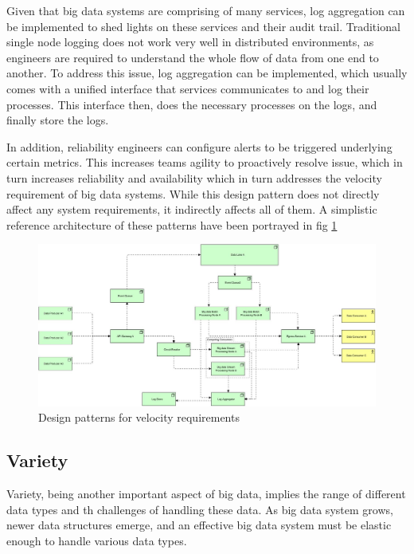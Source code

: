 \documentclass[conference]{IEEEtran}
\begin{document}
Given that big data systems are comprising of many services, log aggregation can be implemented to shed lights on these services and their audit trail. Traditional single node logging does not work very well in distributed environments, as engineers are required to understand the whole flow of data from one end to another. To address this issue, log aggregation can be implemented, which usually comes with a unified interface that services communicates to and log their processes. This interface then, does the necessary processes on the logs, and finally store the logs. 

In addition, reliability engineers can configure alerts to be triggered underlying certain metrics. This increases teams agility to proactively resolve issue, which in turn increases reliability and availability which in turn addresses the velocity requirement of big data systems. While this design pattern does not directly affect any system requirements, it indirectly affects all of them. A simplistic reference architecture of these patterns have been portrayed in fig \ref{fig-vel-ra}


\begin{figure}[h!]
    \includegraphics[width=17cm]{../Media/Velocity Requirement.jpg}
    \caption{Design patterns for velocity requirements}
    \label{fig-vel-ra}
\end{figure}


\subsection{Variety}

Variety, being another important aspect of big data, implies the range of different data types and th challenges of handling these data. As big data system grows, newer data structures emerge, and an effective big data system must be elastic enough to handle various data types. 
\end{document}
